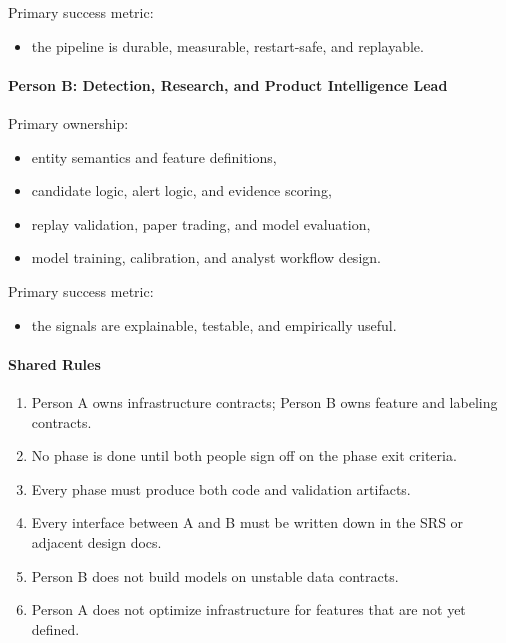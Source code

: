 \documentclass[
]{article}
\providecommand{\tightlist}{%
  \setlength{\itemsep}{0pt}\setlength{\parskip}{0pt}}
\begin{document}
Primary success metric:

\begin{itemize}
\tightlist
\item
  the pipeline is durable, measurable, restart-safe, and replayable.
\end{itemize}

\paragraph{Person B: Detection, Research, and Product Intelligence
Lead}\label{person-b-detection-research-and-product-intelligence-lead}

Primary ownership:

\begin{itemize}
\tightlist
\item
  entity semantics and feature definitions,
\item
  candidate logic, alert logic, and evidence scoring,
\item
  replay validation, paper trading, and model evaluation,
\item
  model training, calibration, and analyst workflow design.
\end{itemize}

Primary success metric:

\begin{itemize}
\tightlist
\item
  the signals are explainable, testable, and empirically useful.
\end{itemize}

\paragraph{Shared Rules}\label{shared-rules}

\begin{enumerate}
\def\labelenumi{\arabic{enumi}.}
\tightlist
\item
  Person A owns infrastructure contracts; Person B owns feature and
  labeling contracts.
\item
  No phase is done until both people sign off on the phase exit
  criteria.
\item
  Every phase must produce both code and validation artifacts.
\item
  Every interface between A and B must be written down in the SRS or
  adjacent design docs.
\item
  Person B does not build models on unstable data contracts.
\item
  Person A does not optimize infrastructure for features that are not
  yet defined.
\end{enumerate}
\end{document}

